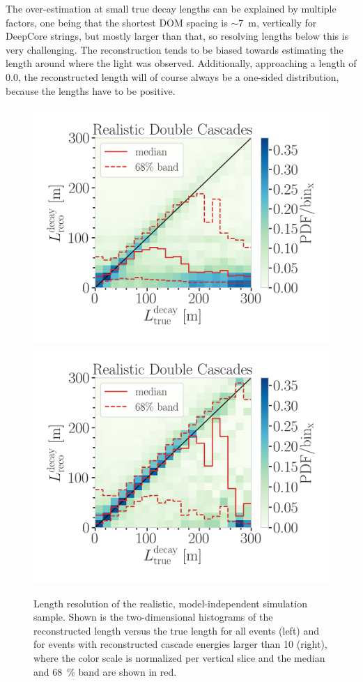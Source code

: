 The over-estimation at small true decay lengths can be explained by multiple factors, one being that the shortest DOM spacing is $\sim$\SI{7}{\meter}, vertically for DeepCore strings, but mostly larger than that, so resolving lengths below this is very challenging. The reconstruction tends to be biased towards estimating the length around where the light was observed. Additionally, approaching a length of 0.0, the reconstructed length will of course always be a one-sided distribution, because the lengths have to be positive.

\begin{figure}[h]
	\centering
    \includegraphics[width=0.49\linewidth]{figures/model_independent_simulation/results/realistic/2d_hists/194603_reco_decay_length_vs_true_decay_length_goodfit_step_contours.png}
    \includegraphics[width=0.49\linewidth]{figures/model_independent_simulation/results/realistic/2d_hists/194603_reco_decay_length_vs_true_decay_length_goodfit_above_10_GeV_step_contours}
    \caption[Realistic double-cascade length resolution]{Length resolution of the realistic, model-independent simulation sample. Shown is the two-dimensional histograms of the reconstructed length versus the true length for all events (left) and for events with reconstructed cascade energies larger than \SI{10}{\gev} (right), where the color scale is normalized per vertical slice and the median and \SI{68}{\percent} band are shown in red.}
\end{figure}

